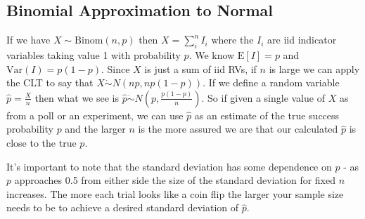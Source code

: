 \subsection{Binomial Approximation to Normal}
If we have $X\sim \mathrm{Binom}(n,p)$ then $X = \sum_i^n I_i$ where the $I_i$ are iid indicator variables taking value 1 with probability $p$. We know $\mathrm{E}[I] = p$ and $\mathrm{Var}(I) = p(1-p)$. Since $X$ is just a sum of iid RVs, if $n$ is large we can apply the CLT to say that $X\dot{\sim}N(np, np(1-p))$. If we define a random variable $\hat{p} = \frac{X}{n}$ then what we see is $\hat{p}\dot{\sim}N(p, \frac{p(1-p)}{n})$. So if given a single value of $X$ as from a poll or an experiment, we can use $\hat{p}$ as an estimate of the true success probability $p$ and the larger $n$ is the more assured we are that our calculated $\hat{p}$ is close to the true $p$. 
\nn

It's important to note that the standard deviation has some dependence on $p$ - as $p$ approaches 0.5 from either side the size of the standard deviation for fixed $n$ increases. The more each trial looks like a coin flip the larger your sample size needs to be to achieve a desired standard deviation of $\hat{p}$.


